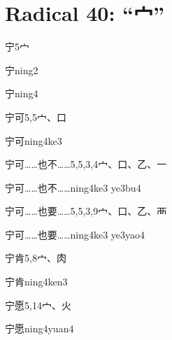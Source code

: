 
\section*{Radical 40: ``⼧''}

\begin{entry}{宁}{5}{⼧}
  \begin{phonetics}{宁}{ning2}
  \end{phonetics}
  \begin{phonetics}{宁}{ning4}
  \end{phonetics}
\end{entry}

\begin{entry}{宁可}{5,5}{⼧、⼝}
  \begin{phonetics}{宁可}{ning4ke3}
  \end{phonetics}
\end{entry}

\begin{entry}{宁可……也不……}{5,5,3,4}{⼧、⼝、⼄、⼀}
  \begin{phonetics}{宁可……也不……}{ning4ke3 ye3bu4}
  \end{phonetics}
\end{entry}

\begin{entry}{宁可……也要……}{5,5,3,9}{⼧、⼝、⼄、⾑}
  \begin{phonetics}{宁可……也要……}{ning4ke3 ye3yao4}
  \end{phonetics}
\end{entry}

\begin{entry}{宁肯}{5,8}{⼧、⾁}
  \begin{phonetics}{宁肯}{ning4ken3}
  \end{phonetics}
\end{entry}

\begin{entry}{宁愿}{5,14}{⼧、⽕}
  \begin{phonetics}{宁愿}{ning4yuan4}
  \end{phonetics}
\end{entry}

